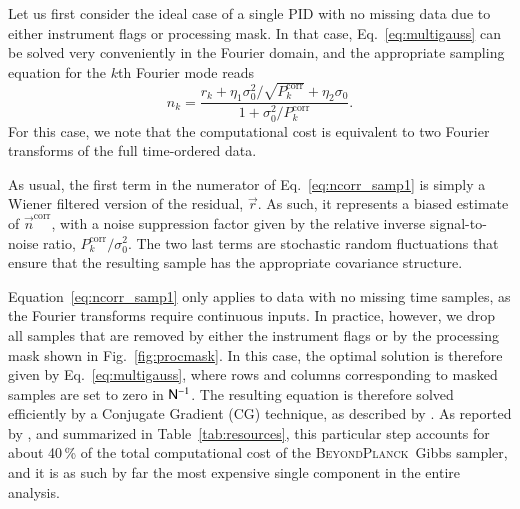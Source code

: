 \documentclass[twocolumn]{aa}
\newcommand{\n}[0]{\vec{n}}
\newcommand{\N}[0]{\tens{N}}
\renewcommand{\r}[0]{\vec{r}}
\newcommand{\BP}{\textsc{BeyondPlanck}}
\begin{document}
Let us first consider the ideal case of a single PID with no missing
data due to either instrument flags or processing mask. In that
case, Eq.~\eqref{eq:multigauss} can be solved very conveniently in
the Fourier domain, and the appropriate sampling equation for the $k$th
Fourier mode reads
\begin{equation}
n_k = \frac{r_k + \eta_1\sigma_0^2/\sqrt{P_k^{\mathrm{corr}}} + \eta_2\sigma_0
  }{1 + \sigma_0^2/P^{\mathrm{corr}}_k}.
\label{eq:ncorr_samp1}
\end{equation}
For this case, we note that the computational cost is equivalent to
two Fourier transforms of the full time-ordered data.

As usual, the first term in the numerator of Eq.~\eqref{eq:ncorr_samp1}
is simply a Wiener filtered version of the residual, $\r$. As such, it
represents a biased estimate of $\n^{\mathrm{corr}}$, with a noise
suppression factor given by the relative inverse signal-to-noise
ratio, $P^{\mathrm{corr}}_k/\sigma_0^2$. The two last terms are
stochastic random fluctuations that ensure that the resulting sample
has the appropriate covariance structure.

Equation~\eqref{eq:ncorr_samp1} only applies to data with no missing
time samples, as the Fourier transforms require continuous inputs. In
practice, however, we drop all samples that are removed by either the
instrument flags or by the processing mask shown in
Fig.~\ref{fig:procmask}. In this case, the optimal solution is
therefore given by Eq.~\eqref{eq:multigauss}, where rows and columns
corresponding to masked samples are set to zero in $\N^{-1} $. The resulting
equation is therefore solved efficiently by a Conjugate Gradient (CG)
technique, as described by \citet{bp02}. As reported by \citet{bp03},
and summarized in Table~\ref{tab:resources}, this particular step
accounts for about 40\,\% of the total computational cost of the
\BP\ Gibbs sampler, and it is as such by far the most expensive single
component in the entire analysis.
\end{document}
